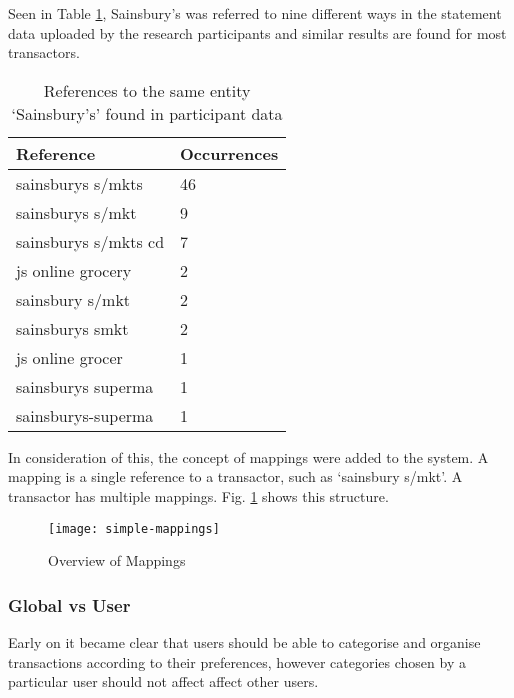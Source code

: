 Seen in Table \ref{tab:sainsburys}, Sainsbury's was referred to nine different ways in the statement data uploaded by the research participants and similar results are found for most \glspl{transactor}.

\begin{table}[h]
\centering
\begin{tabular}{@{}ll@{}}
\toprule
Reference            & Occurrences \\ \midrule
sainsburys s/mkts    & 46          \\
sainsburys s/mkt     & 9           \\
sainsburys s/mkts cd & 7           \\
js online grocery    & 2           \\
sainsbury s/mkt      & 2           \\
sainsburys smkt      & 2           \\
js online grocer     & 1           \\
sainsburys superma   & 1           \\
sainsburys-superma   & 1           \\ \bottomrule
\end{tabular}
\caption{References to the same entity `Sainsbury's' found in participant data}
\label{tab:sainsburys}
\end{table}

In consideration of this, the concept of mappings were added to the system. A mapping is a single reference to a transactor, such as `sainsbury s/mkt'. A transactor has multiple mappings. Fig. \ref{fig:mapping} shows this structure.

\begin{figure}[h]
    \centering
    \texttt{[image: simple-mappings]}
    \caption{Overview of Mappings}
    \label{fig:mapping}
    
    \begin{comment}
[Transaction]<>*-[TransactorMapping]
[TransactorMapping]<>*-[Transactor]
    \end{comment}
\end{figure}


\subsubsection{Global vs User}
Early on it became clear that users should be able to categorise and organise transactions according to their preferences, however categories chosen by a particular user should not affect affect other users.

